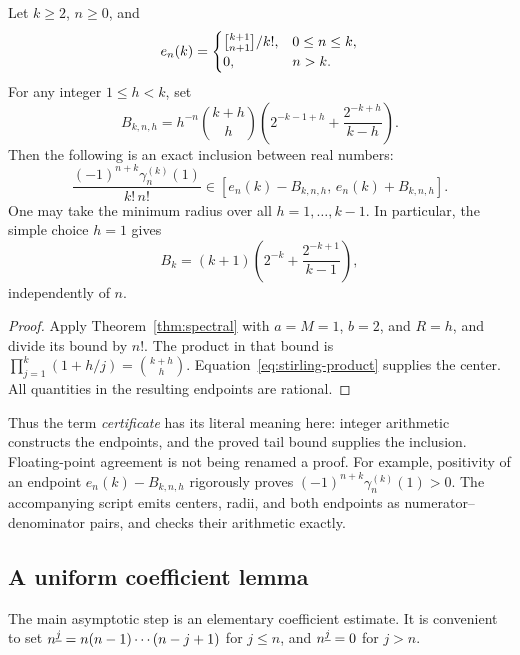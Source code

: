 \begin{corollary}\label{cor:rational}
Let \(k\ge2\), \(n\ge0\), and
\[
e_n(k)=
\begin{cases}
\stirling{k+1}{n+1}/k!,&0\le n\le k,\\
0,&n>k.
\end{cases}
\]
For any integer \(1\le h<k\), set
\begin{equation}\label{eq:rational-radius}
B_{k,n,h}
=h^{-n}\binom{k+h}{h}
 \left(2^{-k-1+h}+\frac{2^{-k+h}}{k-h}\right).
\end{equation}
Then the following is an exact inclusion between real numbers:
\begin{equation}\label{eq:rational-inclusion}
\frac{(-1)^{n+k}\gamma_n^{(k)}(1)}{k!\,n!}
\in[e_n(k)-B_{k,n,h},\,e_n(k)+B_{k,n,h}].
\end{equation}
One may take the minimum radius over all \(h=1,\ldots,k-1\).
In particular, the simple choice \(h=1\) gives
\begin{equation}\label{eq:simple-rational-radius}
B_k=(k+1)\left(2^{-k}+\frac{2^{-k+1}}{k-1}\right),
\end{equation}
independently of \(n\).
\end{corollary}

\begin{proof}
Apply Theorem~\ref{thm:spectral} with \(a=M=1\), \(b=2\), and
\(R=h\), and divide its bound by \(n!\). The product in that bound is
\(\prod_{j=1}^k(1+h/j)=\binom{k+h}{h}\).
Equation~\eqref{eq:stirling-product} supplies the center.
All quantities in the resulting endpoints are rational.
\end{proof}

Thus the term \emph{certificate} has its literal meaning here:
integer arithmetic constructs the endpoints, and the proved tail
bound supplies the inclusion. Floating-point agreement is not being
renamed a proof. For example, positivity of an endpoint
\(e_n(k)-B_{k,n,h}\) rigorously proves
\((-1)^{n+k}\gamma_n^{(k)}(1)>0\).
The accompanying script emits centers, radii, and both endpoints
as numerator--denominator pairs, and checks their arithmetic exactly.

\subsection{A uniform coefficient lemma}

The main asymptotic step is an elementary coefficient estimate.
It is convenient to set
\(n^{\underline{j}}=n(n-1)\cdots(n-j+1)\) for \(j\le n\), and
\(n^{\underline{j}}=0\) for \(j>n\).

